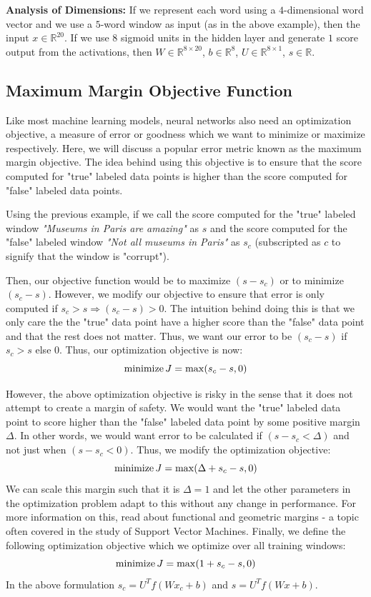 \documentclass{tufte-handout}
\begin{document}
\textbf{Analysis of Dimensions: }If we represent each word using a $4$-dimensional word vector and we use a $5$-word window as input (as in the above example), then the input $x \in \mathbb{R}^{20}$. If we use $8$ sigmoid units in the hidden layer and generate $1$ score output from the activations, then $W \in \mathbb{R}^{8\times 20}$, $b \in \mathbb{R}^{8}$, $U \in \mathbb{R}^{8\times 1}$, $s \in \mathbb{R}$.

\subsection{Maximum Margin Objective Function}\label{sec:maxmargin}

Like most machine learning models, neural networks also need an optimization objective, a measure of error or goodness which we want to minimize or maximize respectively. Here, we will discuss a popular error metric known as the maximum margin objective. The idea behind using this objective is to ensure that the score computed for "true" labeled data points is higher than the score computed for "false" labeled data points. 

Using the previous example, if we call the score computed for the "true" labeled window \textit{"Museums in Paris are amazing"} as $s$ and the score computed for the "false" labeled window \textit{"Not all museums in Paris"} as $s_c$ (subscripted as $c$ to signify that the window is "corrupt").

Then, our objective function would be to maximize $(s - s_c)$ or to minimize $(s_c - s)$. However, we modify our objective to ensure that error is only computed if $s_c > s \Rightarrow (s_c - s) > 0$. The intuition behind doing this is that we only care the the "true" data point have a higher score than the "false" data point and that the rest does not matter. Thus, we want our error to be $(s_c - s)$ if $s_c > s$ else 0. Thus, our optimization objective is now:
$$\operatornamewithlimits{minimize} J = \max(s_c - s, 0)$$

However, the above optimization objective is risky in the sense that it does not attempt to create a margin of safety. We would want the "true" labeled data point to score higher than the "false" labeled data point by some positive margin $\Delta$. In other words, we would want error to be calculated if $(s - s_c < \Delta)$ and not just when $(s - s_c < 0)$. Thus, we modify the optimization objective:
$$\operatornamewithlimits{minimize} J = \max(\Delta+s_c - s, 0)$$
We can scale this margin such that it is $\Delta = 1$ and let the other parameters in the optimization problem adapt to this without any change in performance. For more information on this, read about functional and geometric margins - a topic often covered in the study of Support Vector Machines.
Finally, we define the following optimization objective which we optimize over all training windows:
$$\operatornamewithlimits{minimize} J = \max(1+s_c - s, 0)$$
In the above formulation $s_c = U^T f(Wx_c + b)$ and $s = U^T f(Wx + b)$.
\end{document}
